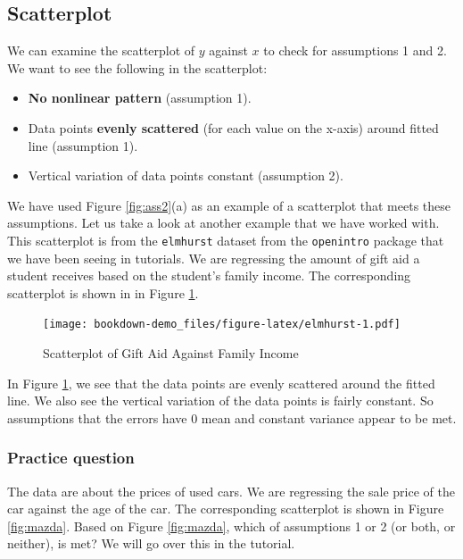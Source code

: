\documentclass[
]{book}
\providecommand{\tightlist}{%
  \setlength{\itemsep}{0pt}\setlength{\parskip}{0pt}}
\begin{document}
\hypertarget{scatterplot}{%
\subsection{Scatterplot}\label{scatterplot}}

We can examine the scatterplot of \(y\) against \(x\) to check for assumptions 1 and 2. We want to see the following in the scatterplot:

\begin{itemize}
\tightlist
\item
  \textbf{No nonlinear pattern} (assumption 1).
\item
  Data points \textbf{evenly scattered} (for each value on the x-axis) around fitted line (assumption 1).
\item
  Vertical variation of data points constant (assumption 2).
\end{itemize}

We have used Figure \ref{fig:ass2}(a) as an example of a scatterplot that meets these assumptions. Let us take a look at another example that we have worked with. This scatterplot is from the \texttt{elmhurst} dataset from the \texttt{openintro} package that we have been seeing in tutorials. We are regressing the amount of gift aid a student receives based on the student's family income. The corresponding scatterplot is shown in in Figure \ref{fig:elmhurst}.

\begin{figure}
\centering
\texttt{[image: bookdown-demo\_files/figure-latex/elmhurst-1.pdf]}
\caption{\label{fig:elmhurst}Scatterplot of Gift Aid Against Family Income}
\end{figure}

In Figure \ref{fig:elmhurst}, we see that the data points are evenly scattered around the fitted line. We also see the vertical variation of the data points is fairly constant. So assumptions that the errors have 0 mean and constant variance appear to be met.

\hypertarget{practice-question}{%
\subsubsection{Practice question}\label{practice-question}}

The data are about the prices of used cars. We are regressing the sale price of the car against the age of the car. The corresponding scatterplot is shown in Figure \ref{fig:mazda}. Based on Figure \ref{fig:mazda}, which of assumptions 1 or 2 (or both, or neither), is met? We will go over this in the tutorial.
\end{document}
